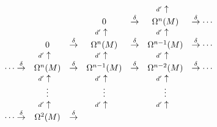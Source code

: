 \begin{equation} %


\label{comp_br}


\begin{array}{ccccccc}


& & & & & \llap{$\scriptstyle d'$}\uparrow \\


%


 & & & 0 & \stackrel{\delta}{\to} & \Omega^{n}(M) &


\stackrel{\delta}{\to}\cdots \\


%


& & & \llap{$\scriptstyle d'$}\uparrow & & \llap{$\scriptstyle d'$}\uparrow \\


%


& 0 & \stackrel{\delta}{\to} & \Omega^{n}(M) &  \stackrel{\delta}{\to} &


\Omega^{n-1}(M) &  \stackrel{\delta}{\to}\cdots \\


%


& \llap{$\scriptstyle d'$}\uparrow & & \llap{$\scriptstyle d'$}\uparrow &


& \llap{$\scriptstyle d'$}\uparrow \\


%


\cdots\stackrel{\delta}{\to} & \Omega^{n}(M) &  \stackrel{\delta}{\to} &


\Omega^{n-1}(M) &  \stackrel{\delta}{\to} & \Omega^{n-2}(M) &


\stackrel{\delta}{\to} \cdots\\


%


& \llap{$\scriptstyle d'$}\uparrow & & \llap{$\scriptstyle d'$}\uparrow &


& \llap{$\scriptstyle d'$}\uparrow \\


%


 & \vdots & & \vdots & & \vdots \\


%


& \llap{$\scriptstyle d'$}\uparrow & & \llap{$\scriptstyle d'$}\uparrow &


& \llap{$\scriptstyle d'$}\uparrow \\


%


\cdots\stackrel{\delta}{\to} & \Omega^{2}(M) &  \stackrel{\delta}{\to} &



\end{array}
\end{equation}
